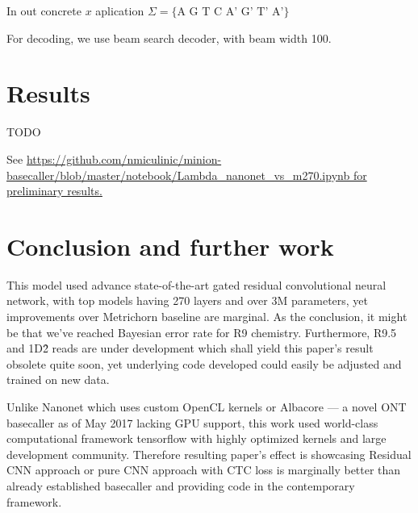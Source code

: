 \documentclass[times, utf8, seminar, numeric]{fer}
\begin{document}
In out concrete $x$ aplication $\Sigma = \{\text{A G T C A' G' T' A'}\}$

For decoding, we use beam search decoder, with beam width 100.

\chapter{Results}

TODO

See \url{https://github.com/nmiculinic/minion-basecaller/blob/master/notebook/Lambda_nanonet_vs_m270.ipynb for preliminary results.}

\chapter{Conclusion and further work}

This model used advance state-of-the-art gated residual convolutional neural network, with top models having 270 layers and over 3M parameters, yet improvements over Metrichorn baseline are marginal. As the conclusion, it might be that we've reached Bayesian error rate for R9 chemistry. Furthermore, R9.5 and 1D\^2 reads are under development which shall yield this paper's result obsolete quite soon, yet underlying code developed could easily be adjusted and trained on new data.

Unlike Nanonet which uses custom OpenCL kernels or Albacore --- a novel ONT basecaller as of May 2017 lacking GPU support, this work used world-class computational framework tensorflow with highly optimized kernels and large development community. Therefore resulting paper's effect is showcasing Residual CNN approach or pure CNN approach with CTC loss is marginally better than already established basecaller and providing code in the contemporary framework.



\end{document}
